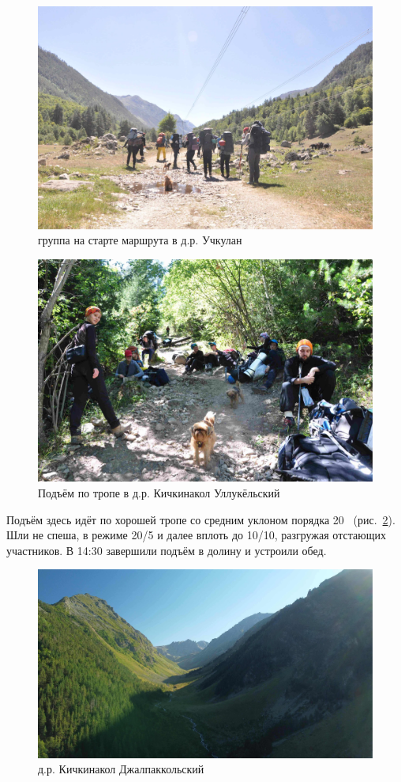 \begin{figure}[h!]
	\centering
	\includegraphics[width=0.7\linewidth]{../pics/DSC_0412}
	\caption{группа на старте маршрута в д.р. Учкулан}
	\label{fig:uchkulan}
\end{figure}

\begin{figure}[h!]
	\centering
	\includegraphics[width=0.7\linewidth]{../pics/DSC_0436}
	\caption{Подъём по тропе в д.р. Кичкинакол Уллукёльский}
	\label{fig:DSC_0436}
\end{figure}

Подъём здесь идёт по хорошей тропе со средним уклоном порядка 20\degree~ (рис.~\ref{fig:DSC_0436}). Шли не спеша, в режиме 20/5 и далее вплоть до 10/10, разгружая отстающих участников. В 14:30 завершили подъём в долину и устроили обед.

\begin{figure}[h!]
	\centering
	\includegraphics[width=0.7\linewidth]{../pics/DJI_0805}
	\caption{д.р. Кичкинакол Джалпаккольский}
	\label{fig:kichkinakol}
\end{figure}

